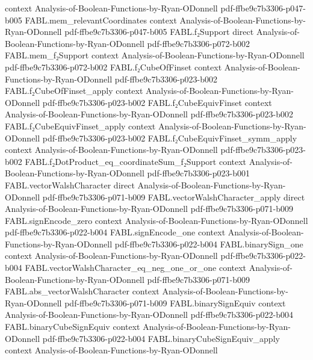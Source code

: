 \begin{theorem}
  {context}
  {Analysis-of-Boolean-Functions-by-Ryan-ODonnell}
  {pdf-ffbe9c7b3306-p047-b005}
\proofstep
  {FABL.mem_relevantCoordinates}
  {context}
  {Analysis-of-Boolean-Functions-by-Ryan-ODonnell}
  {pdf-ffbe9c7b3306-p047-b005}
\proofstep
  {FABL.f₂Support}
  {direct}
  {Analysis-of-Boolean-Functions-by-Ryan-ODonnell}
  {pdf-ffbe9c7b3306-p072-b002}
\proofstep
  {FABL.mem_f₂Support}
  {context}
  {Analysis-of-Boolean-Functions-by-Ryan-ODonnell}
  {pdf-ffbe9c7b3306-p072-b002}
\proofstep
  {FABL.f₂CubeOfFinset}
  {context}
  {Analysis-of-Boolean-Functions-by-Ryan-ODonnell}
  {pdf-ffbe9c7b3306-p023-b002}
\proofstep
  {FABL.f₂CubeOfFinset_apply}
  {context}
  {Analysis-of-Boolean-Functions-by-Ryan-ODonnell}
  {pdf-ffbe9c7b3306-p023-b002}
\proofstep
  {FABL.f₂CubeEquivFinset}
  {context}
  {Analysis-of-Boolean-Functions-by-Ryan-ODonnell}
  {pdf-ffbe9c7b3306-p023-b002}
\proofstep
  {FABL.f₂CubeEquivFinset_apply}
  {context}
  {Analysis-of-Boolean-Functions-by-Ryan-ODonnell}
  {pdf-ffbe9c7b3306-p023-b002}
\proofstep
  {FABL.f₂CubeEquivFinset_symm_apply}
  {context}
  {Analysis-of-Boolean-Functions-by-Ryan-ODonnell}
  {pdf-ffbe9c7b3306-p023-b002}
\proofstep
  {FABL.f₂DotProduct_eq_coordinateSum_f₂Support}
  {context}
  {Analysis-of-Boolean-Functions-by-Ryan-ODonnell}
  {pdf-ffbe9c7b3306-p023-b001}
\proofstep
  {FABL.vectorWalshCharacter}
  {direct}
  {Analysis-of-Boolean-Functions-by-Ryan-ODonnell}
  {pdf-ffbe9c7b3306-p071-b009}
\proofstep
  {FABL.vectorWalshCharacter_apply}
  {direct}
  {Analysis-of-Boolean-Functions-by-Ryan-ODonnell}
  {pdf-ffbe9c7b3306-p071-b009}
\proofstep
  {FABL.signEncode_zero}
  {context}
  {Analysis-of-Boolean-Functions-by-Ryan-ODonnell}
  {pdf-ffbe9c7b3306-p022-b004}
\proofstep
  {FABL.signEncode_one}
  {context}
  {Analysis-of-Boolean-Functions-by-Ryan-ODonnell}
  {pdf-ffbe9c7b3306-p022-b004}
\proofstep
  {FABL.binarySign_one}
  {context}
  {Analysis-of-Boolean-Functions-by-Ryan-ODonnell}
  {pdf-ffbe9c7b3306-p022-b004}
\proofstep
  {FABL.vectorWalshCharacter_eq_neg_one_or_one}
  {context}
  {Analysis-of-Boolean-Functions-by-Ryan-ODonnell}
  {pdf-ffbe9c7b3306-p071-b009}
\proofstep
  {FABL.abs_vectorWalshCharacter}
  {context}
  {Analysis-of-Boolean-Functions-by-Ryan-ODonnell}
  {pdf-ffbe9c7b3306-p071-b009}
\proofstep
  {FABL.binarySignEquiv}
  {context}
  {Analysis-of-Boolean-Functions-by-Ryan-ODonnell}
  {pdf-ffbe9c7b3306-p022-b004}
\proofstep
  {FABL.binaryCubeSignEquiv}
  {context}
  {Analysis-of-Boolean-Functions-by-Ryan-ODonnell}
  {pdf-ffbe9c7b3306-p022-b004}
\proofstep
  {FABL.binaryCubeSignEquiv_apply}
  {context}
  {Analysis-of-Boolean-Functions-by-Ryan-ODonnell}

\end{theorem}
